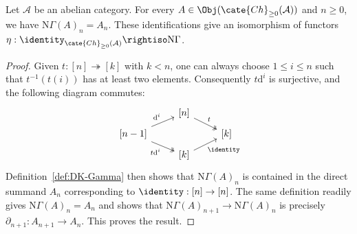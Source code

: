 \begin{lemma}\label{prop:DK-N-unit}
	Let $\mathcal{A}$ be an abelian category. For every
	$A\in\Obj(\cate{Ch}_{\geq0}(\mathcal{A}))$ and $n\geq0$, we have
	$\mathrm{N}\Gamma(A)_n=A_n$. These identifications give an isomorphism
	of functors
	$\eta:\identity_{\cate{Ch}_{\geq0}(\mathcal{A})}\rightiso
	\mathrm{N}\Gamma$.
\end{lemma}
\begin{proof}
	Given $t:[n]\twoheadrightarrow[k]$ with $k<n$, one can always choose
	$1\leq i\leq n$ such that $t^{-1}(t(i))$ has at least two elements.
	Consequently $t\mathrm{d}^i$ is surjective, and the following diagram
	commutes:
	\[\begin{tikzcd}[row sep=tiny]
		& {[n]} \arrow[twoheadrightarrow, rd, "t"] & \\
		{[n-1]} \arrow[ru, "{\mathrm{d}^i}"] \arrow[twoheadrightarrow, rd, "{t\mathrm{d}^i}"'] & & {[k]} \\
		& {[k]} \arrow[ru, "{\identity}"'] &
	\end{tikzcd}\]
	Definition~\ref{def:DK-Gamma} then shows that
	$\mathrm{N}\Gamma(A)_n$ is contained in the direct summand $A_n$
	corresponding to $\identity:[n]\to[n]$. The same definition readily
	gives $\mathrm{N}\Gamma(A)_n=A_n$ and shows that
	$\mathrm{N}\Gamma(A)_{n+1}\to\mathrm{N}\Gamma(A)_n$ is precisely
	$\partial_{n+1}:A_{n+1}\to A_n$. This proves the result.
\end{proof}

